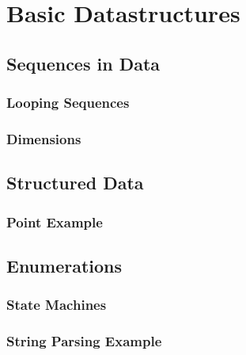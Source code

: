 \chapter{Basic Datastructures}

\section{Sequences in Data}

\subsection{Looping Sequences}

\subsection{Dimensions}

\section{Structured Data}

\subsection{Point Example}

\section{Enumerations}

\subsection{State Machines}

\subsection{String Parsing Example}

